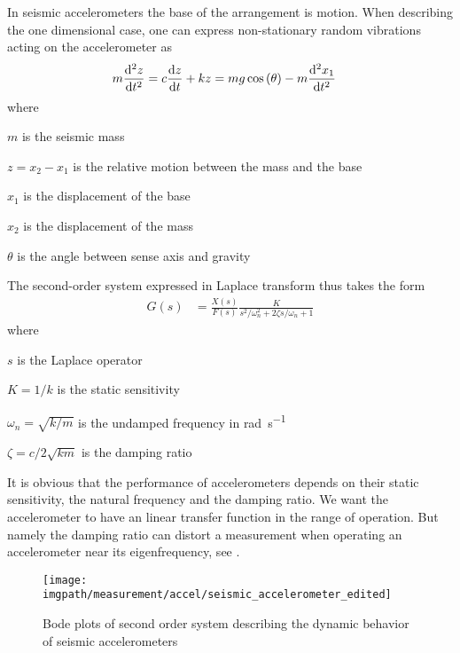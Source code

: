 In seismic accelerometers the base of the arrangement is motion. When describing the one dimensional case, one can express non-stationary random vibrations acting on the accelerometer as
\begin{align}
    m\dv[2]{z}{t} &= c\dv{z}{t} + kz = mg\cos\pqty{\theta}-m\dv[2]{x_1}{t}
\end{align}
where
\begin{description}[topsep=0ex, noitemsep]
    \item $m$ is the seismic mass
    \item $z=x_2-x_1$ is the relative motion between the mass and the base
    \item $x_1$ is the displacement of the base
    \item $x_2$ is the displacement of the mass
    \item $\theta$ is the angle between sense axis and gravity
\end{description}
The second-order system expressed in Laplace transform thus takes the form
\begin{align}
    G(s) &= \frac{X(s)}{F(s)} \frac{K}{s^2/\omega_n^2 + 2\zeta s/\omega_n + 1}
\end{align}
where
\begin{description}[topsep=0ex, noitemsep]
    \item $s$ is the Laplace operator
    \item $K=1/k$ is the static sensitivity
    \item $\omega_n=\sqrt{k/m}$ is the undamped frequency in \si{\radian\per\second}
    \item $\zeta=c/2\sqrt{km}$ is the damping ratio
\end{description}
It is obvious that the performance of accelerometers depends on their static sensitivity, the natural frequency and the damping ratio. We want the accelerometer to have an linear transfer function in the range of operation. But namely the damping ratio can distort a measurement when operating an accelerometer near its eigenfrequency, see .


\begin{figure}[!htb]
    \centering
    \texttt{[image: \\imgpath/measurement/accel/seismic\_accelerometer\_edited]}
    \caption[Second-Order System Bode plots]{Bode plots of second order system describing the dynamic behavior of seismic accelerometers}
    \label{fig:seismic_accelerometer_edited}
\end{figure}

